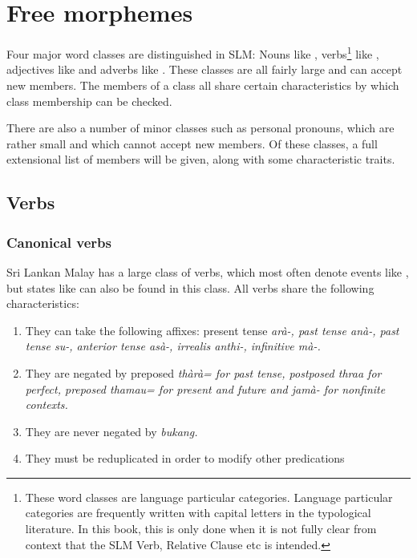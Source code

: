 \chapter{Free morphemes}\label{sec:form:freemorphemes}
Four major word classes are distinguished in SLM: Nouns like , verbs\footnote{These word classes are language particular categories. Language particular categories are frequently  written with capital letters in the typological literature\citep[cf.][]{Comrie1976, Bybee1985, Haspelmath}. In this book, this is only done when it is not fully clear from context that the SLM Verb, Relative Clause etc is intended.} like , adjectives like  and adverbs like . These classes are all fairly large and can accept new members. The members of a class all share certain characteristics by which class membership can be checked.

There are also a number of minor classes such as personal pronouns, which are rather small and which cannot accept new members. Of these classes, a full extensional list of members will be given, along with some characteristic traits.

\section{Verbs}\label{sec:wc:Verbs}
\subsection{Canonical verbs}\label{sec:wc:Canonicalverbs}
Sri Lankan Malay has a large class of verbs, which most often denote events like , but  states like  can also be found in this class. All verbs share the following characteristics:

\begin{enumerate}
\item They can take the following affixes:
	present tense \em arà-\em,
	past tense \em anà-\em,
	past tense \em su-\em,
	anterior tense \em asà-\em,
	irrealis \em anthi-\em,
	infinitive \em mà-\em.
\item They are negated by preposed \em thàrà= \em for past tense, postposed \em thraa \em for perfect,  preposed \em thamau= \em for present and future and \em jamà- \em for nonfinite contexts.
\item They are never negated by \em bukang\em.
\item They must be reduplicated in order to modify other predications
\end{enumerate}


